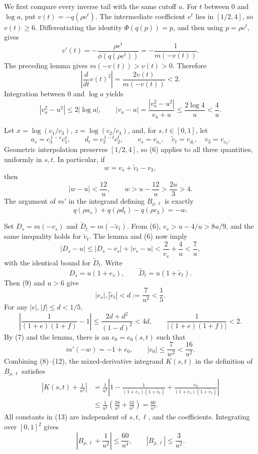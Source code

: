 We first compare every inverse tail with the same cutoff \(u\).  For \(t\) between \(0\) and \(\log a\), put \(v(t)=-q(\rho e^t)\).  The intermediate coefficient \(e^t\) lies in \([1/2,4]\), so \(v(t)\ge6\).  Differentiating the identity \(\Phi(q(p))=p\), and then using \(p=\rho e^t\), gives
\[
v'(t)=-\frac{\rho e^t}{\phi(q(\rho e^t))}
=-\frac1{m(-v(t))}.
\tag{5}
\]
The preceding lemma gives \(m(-v(t))>v(t)>0\).  Therefore
\[
\left|\frac{d}{dt}v(t)^2\right|
=\frac{2v(t)}{m(-v(t))}<2.
\]
Integration between \(0\) and \(\log a\) yields
\[
|v_a^2-u^2|\le2|\log a|,
\qquad
|v_a-u|
=\frac{|v_a^2-u^2|}{v_a+u}
\le\frac{2\log4}{u}<\frac4u.
\tag{6}
\]

Let \(x=\log(c_1/c_3)\), \(z=\log(c_2/c_3)\), and, for \(s,t\in[0,1]\), let
\[
a_s=c_3^{\,1-s}c_1^s,
\qquad
d_t=c_3^{\,1-t}c_2^t,
\qquad
v_s=v_{a_s},\quad \widetilde v_t=v_{d_t},\quad v_3=v_{c_3}.
\]
Geometric interpolation preserves \([1/2,4]\), so (6) applies to all three quantities, uniformly in \(s,t\).  In particular, if
\[
w=v_s+\widetilde v_t-v_3,
\]
then
\[
|w-u|<\frac{12}{u},
\qquad
w>u-\frac{12}{u}>\frac{2u}{3}>4.
\tag{7}
\]
The argument of \(m'\) in the integrand defining \(B_{\rho,\ell}\) is exactly
\[
q(\rho a_s)+q(\rho d_t)-q(\rho c_3)=-w.
\tag{8}
\]

Set \(D_s=m(-v_s)\) and \(\widetilde D_t=m(-\widetilde v_t)\).  From (6), \(v_s>u-4/u>8u/9\), and the same inequality holds for \(\widetilde v_t\).  The lemma and (6) now imply
\[
|D_s-u|
\le |D_s-v_s|+|v_s-u|
<\frac2{v_s}+\frac4u
<\frac7u,
\tag{9}
\]
with the identical bound for \(\widetilde D_t\).  Write
\[
D_s=u(1+e_s),\qquad \widetilde D_t=u(1+\widetilde e_t).
\]
Then (9) and \(u>6\) give
\[
|e_s|,|\widetilde e_t|<d:=\frac7{u^2}<\frac15.
\tag{10}
\]
For any \(|e|,|f|\le d<1/5\),
\[
\left|\frac1{(1+e)(1+f)}-1\right|
\le\frac{2d+d^2}{(1-d)^2}<4d,
\qquad
\frac1{|(1+e)(1+f)|}<2.
\tag{11}
\]
By (7) and the lemma, there is an \(e_0=e_0(s,t)\) such that
\[
m'(-w)=-1+e_0,
\qquad
|e_0|\le\frac7{w^2}<\frac{16}{u^2}.
\tag{12}
\]
Combining (8)--(12), the mixed-derivative integrand \(K(s,t)\) in the definition of \(B_{\rho,\ell}\) satisfies
\[
\begin{aligned}
\left|K(s,t)+\frac1{u^2}\right|
&=\frac1{u^2}
\left|1-\frac1{(1+e_s)(1+\widetilde e_t)}
+\frac{e_0}{(1+e_s)(1+\widetilde e_t)}\right|\\
&\le\frac1{u^2}\left(\frac{28}{u^2}+\frac{32}{u^2}\right)
=\frac{60}{u^4}.
\end{aligned}
\tag{13}
\]
All constants in (13) are independent of \(s,t,\ell\), and the coefficients.  Integrating over \([0,1]^2\) gives
\[
\left|B_{\rho,\ell}+\frac1{u^2}\right|\le\frac{60}{u^4},
\qquad
|B_{\rho,\ell}|\le\frac3{u^2}.
\tag{14}
\]


